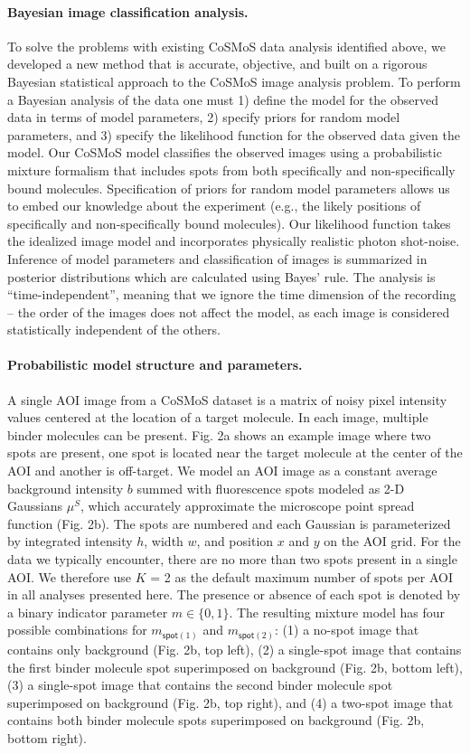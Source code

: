 \paragraph{Bayesian image classification analysis.}
To solve the problems with existing CoSMoS data analysis identified above, we developed a new method that is accurate, objective, and built on a rigorous Bayesian statistical approach to the CoSMoS image analysis problem. To perform a Bayesian analysis of the data one must 1) define the model for the observed data in terms of model parameters, 2) specify priors for random model parameters, and 3) specify the likelihood function for the observed data given the model. Our CoSMoS model classifies the observed images using a probabilistic mixture formalism that includes spots from both specifically and non-specifically bound molecules. Specification of priors for random model parameters allows us to embed our knowledge about the experiment (e.g., the likely positions of specifically and non-specifically bound molecules). Our likelihood function takes the idealized image model and incorporates physically realistic photon shot-noise. Inference of model parameters and classification of images is summarized in posterior distributions which are calculated using Bayes' rule. The analysis is “time-independent”, meaning that we ignore the time dimension of the recording -- the order of the images does not affect the model, as each image is considered statistically independent of the others. 

\paragraph{Probabilistic model structure and parameters.} %
A single AOI image from a CoSMoS dataset is a matrix of noisy pixel intensity values centered at the location of a target molecule. In each image, multiple binder molecules can be present. Fig. 2a shows an example image where two spots are present, one spot is located near the target molecule at the center of the AOI and another is off-target. We model an AOI image as a constant average background intensity $b$ summed with fluorescence spots modeled as 2-D Gaussians $\mu^S$, which accurately approximate the microscope point spread function \cite{Zhang2007-rb} (Fig. 2b). The spots are numbered and each Gaussian is parameterized by integrated intensity $h$, width $w$, and position $x$ and $y$ on the AOI grid. For the data we typically encounter, there are no more than two spots present in a single AOI. We therefore use $K$ = 2 as the default maximum  number of spots per AOI in all analyses presented here. The presence or absence of each spot is denoted by a binary indicator parameter $m \in \{0, 1\}$. The resulting mixture model has four possible combinations for $m_{\mathsf{spot}(1)}$ and $m_{\mathsf{spot}(2)}$: (1) a no-spot image that contains only background (Fig. 2b, top left), (2) a single-spot image that contains the first binder molecule spot superimposed on background (Fig. 2b, bottom left), (3) a single-spot image that contains the second binder molecule spot superimposed on background (Fig. 2b, top right), and (4) a two-spot image that contains both binder molecule spots superimposed on background (Fig. 2b, bottom right).


